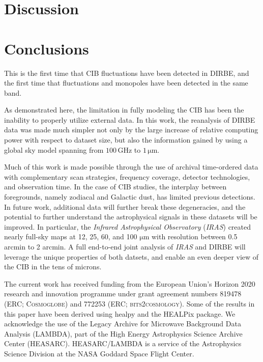 \documentclass{aa}
\begin{document}
\section{Discussion}
\label{sec:discussion}

\section{Conclusions}
\label{sec:conclusions}

This is the first time that CIB fluctuations have been detected in DIRBE, and the first time that fluctuations and monopoles have been detected in the same band.

As demonstrated here, the limitation in fully modeling the CIB has been the inability to properly utilize external data. In this work, the reanalysis of DIRBE data was made much simpler not only by the large increase of relative computing power with respect to dataset size, but also the information gained by using a global sky model spanning from $100\,\mathrm{GHz}$ to $1\,\mathrm{\mu m}$.

Much of this work is made possible through the use of archival time-ordered data with complementary scan strategies, frequency coverage, detector technologies, and observation time. In the case of CIB studies, the interplay between foregrounds, namely zodiacal and Galactic dust, has limited previous detections. In future work, additional data will further break these degeneracies, and the potential to further understand the astrophysical signals in these datasets will be improved. In particular, the \textit{Infrared Astrophysical Observatory} (\textit{IRAS}) created nearly full-sky maps at 12, 25, 60, and 100 $\mathrm{\mu m}$ with resolution between 0.5 arcmin to 2 arcmin. A full end-to-end joint analysis of \textit{IRAS} and DIRBE will leverage the unique properties of both datsets, and enable an even deeper view of the CIB in the tens of microns.

\begin{acknowledgements}
 The current work has received funding from the European
  Union’s Horizon 2020 research and innovation programme under grant
  agreement numbers 819478 (ERC; \textsc{Cosmoglobe}) and 772253 (ERC;
	\textsc{bits2cosmology}). Some of the results in this paper have been derived using healpy \citep{Zonca2019} and the HEALPix \citep{healpix} package.
  We acknowledge the use of the Legacy Archive for Microwave Background Data
  Analysis (LAMBDA), part of the High Energy Astrophysics Science Archive Center
  (HEASARC). HEASARC/LAMBDA is a service of the Astrophysics Science Division at
  the NASA Goddard Space Flight Center.  
\end{acknowledgements}


%



\end{document}
